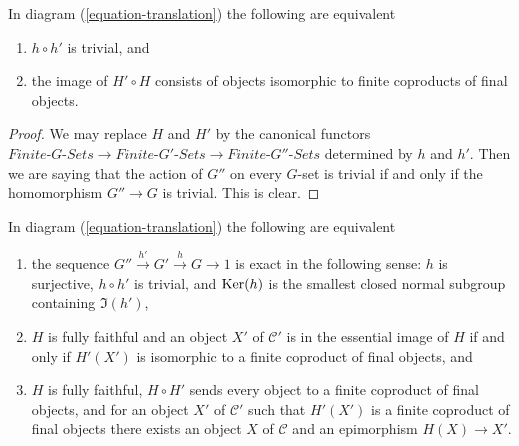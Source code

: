\begin{lemma}
\label{lemma-composition-trivial}
In diagram (\ref{equation-translation}) the following are equivalent
\begin{enumerate}
\item $h \circ h'$ is trivial, and
\item the image of $H' \circ H$ consists of objects isomorphic to finite
coproducts of final objects.
\end{enumerate}
\end{lemma}

\begin{proof}
We may replace $H$ and $H'$ by the canonical functors
$\textit{Finite-}G\textit{-Sets} \to \textit{Finite-}G'\textit{-Sets}
\to \textit{Finite-}G''\textit{-Sets}$ determined by $h$ and $h'$.
Then we are saying that the action of $G''$ on every $G$-set is trivial
if and only if the homomorphism $G'' \to G$ is trivial. This is clear.
\end{proof}

\begin{lemma}
\label{lemma-functoriality-galois-ses}
In diagram (\ref{equation-translation}) the following are equivalent
\begin{enumerate}
\item the sequence $G'' \xrightarrow{h'} G' \xrightarrow{h} G \to 1$
is exact in the following sense: $h$ is surjective, $h \circ h'$ is trivial,
and $\mathop{\mathrm{Ker}}(h)$ is the smallest closed normal subgroup containing $\Im(h')$,
\item $H$ is fully faithful and an object $X'$ of $\mathcal{C}'$ is in
the essential image of $H$ if and only if $H'(X')$ is isomorphic to a
finite coproduct of final objects, and
\item $H$ is fully faithful, $H \circ H'$ sends every object to a finite
coproduct of final objects, and for an object $X'$ of $\mathcal{C}'$
such that $H'(X')$ is a finite coproduct of final objects there exists
an object $X$ of $\mathcal{C}$ and an epimorphism $H(X) \to X'$.
\end{enumerate}
\end{lemma}

